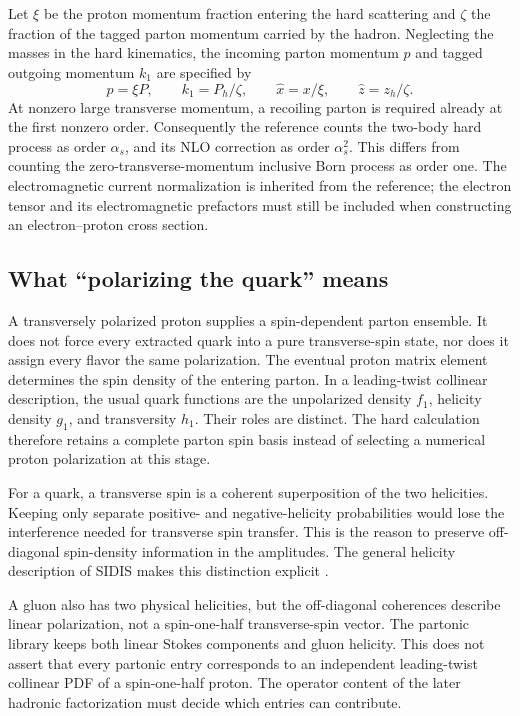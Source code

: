 \documentclass[11pt,a4paper]{article}
\newcommand{\as}{\alpha_s}
\begin{document}
Let $\xi$ be the proton momentum fraction entering the hard scattering and $\zeta$ the fraction of the tagged parton momentum carried by the hadron. Neglecting the masses in the hard kinematics, the incoming parton momentum $p$ and tagged outgoing momentum $k_1$ are specified by
\begin{equation}
 p=\xi P,\qquad k_1=P_h/\zeta,\qquad
 \widehat x=x/\xi,\qquad \widehat z=z_h/\zeta.
\end{equation}
At nonzero large transverse momentum, a recoiling parton is required already at the first nonzero order. Consequently the reference counts the two-body hard process as order $\as$, and its NLO correction as order $\as^2$. This differs from counting the zero-transverse-momentum inclusive Born process as order one. The electromagnetic current normalization is inherited from the reference; the electron tensor and its electromagnetic prefactors must still be included when constructing an electron--proton cross section.

\subsection{What ``polarizing the quark'' means}
A transversely polarized proton supplies a spin-dependent parton ensemble. It does not force every extracted quark into a pure transverse-spin state, nor does it assign every flavor the same polarization. The eventual proton matrix element determines the spin density of the entering parton. In a leading-twist collinear description, the usual quark functions are the unpolarized density $f_1$, helicity density $g_1$, and transversity $h_1$. Their roles are distinct. The hard calculation therefore retains a complete parton spin basis instead of selecting a numerical proton polarization at this stage.

For a quark, a transverse spin is a coherent superposition of the two helicities. Keeping only separate positive- and negative-helicity probabilities would lose the interference needed for transverse spin transfer. This is the reason to preserve off-diagonal spin-density information in the amplitudes. The general helicity description of SIDIS makes this distinction explicit \cite{helicity}.

A gluon also has two physical helicities, but the off-diagonal coherences describe linear polarization, not a spin-one-half transverse-spin vector. The partonic library keeps both linear Stokes components and gluon helicity. This does not assert that every partonic entry corresponds to an independent leading-twist collinear PDF of a spin-one-half proton. The operator content of the later hadronic factorization must decide which entries can contribute.
\end{document}
